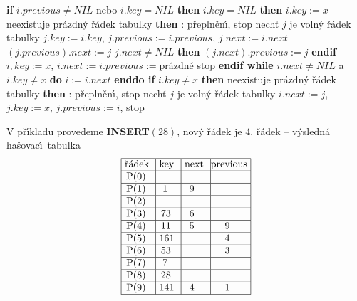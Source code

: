 {\bf if} $i.previous\ne NIL$ nebo $i.key= NIL$ {\bf then}\newline
\phantom{---}{\bf if} $i.key=NIL$ {\bf then}\newline 
\phantom{------}$i.key:=x$\newline 
\phantom{---}{\bf else}\newline 
\phantom{------}{\bf if} neexistuje pr\'azdn\'y \v r\'adek tabulky {\bf then}\newline 
\phantom{---------}{\bf V\'ystup}: p\v repln\v en\'\i , stop\newline 
\phantom{------}{\bf else}\newline 
\phantom{---------}nech\v t $j$ je voln\'y \v r\'adek tabulky\newline 
\phantom{---------}$j.key:=i.key$, $j.previous:=i.previous$, $j.next
:=i.next$\newline 
\phantom{---------}$(j.previous).next:=j$\newline 
\phantom{---------}{\bf if} $j.next\ne NIL$ {\bf then} $(j.next).previous:=j$ {\bf endif}\newline 
\phantom{---------}$i,key:=x$, $i.next:=i.previous:=$pr\'azdn\'e\newline 
\phantom{------}{\bf endif}\newline 
\phantom{---}{\bf endif}\newline
\phantom{---}stop\newline
{\bf endif\newline
while} $i.next\ne NIL$ a $i.key\ne x$ {\bf do} $i:=i.next$ {\bf enddo\newline 
if} $i.key\ne x$ {\bf then}\newline 
\phantom{---}{\bf if} neexistuje pr\'azdn\'y \v r\'adek tabulky {\bf then}\newline 
\phantom{------}{\bf V\'ystup}: p\v repln\v en\'\i , stop\newline 
\phantom{---}{\bf else}\newline 
\phantom{------}nech\v t $j$ je voln\'y \v r\'adek tabulky\newline 
\phantom{------}$i.next:=j$, $j.key:=x$, $j.previous:=i$, stop\newline 
\phantom{---}{\bf endif\newline 
endif\newline 
endif}
\bigskip

\flushpar V p\v r\'\i kladu provedeme {\bf INSERT$(28)$}, nov\'y \v r\'adek je 4. \v r\'adek\newline 
-- v\'ysledn\'a ha\v sovac\'\i\ tabulka
$$\vtop{\offinterlineskip\halign {\strut\vrule\ # & \vrule\ # & \vrule\ # & \vrule \hfil # \hfil \vrule\cr\noalign{\hrule}\v r\'adek & key & next & previous\hfil \cr\noalign{\hrule}P(0) & & &\hfill \cr\noalign{\hrule}P(1) & 1 & 9 &\hfill \cr\noalign{\hrule}P(2) & & &\hfill \cr\noalign{\hrule}P(3) & 73 & 6 &\hfill \cr\noalign{\hrule}P(4) & 11 & 5 & 9 \cr\noalign{\hrule}P(5) & 161 & & 4 \cr\noalign{\hrule}P(6) & 53 & & 3 \cr\noalign{\hrule}P(7) & 7 & &\hfill \cr\noalign{\hrule}P(8) & 28 &  &\hfill  \cr\noalign{\hrule}P(9) & 141 & 4 & 1 \cr\noalign{\hrule}}}$$

